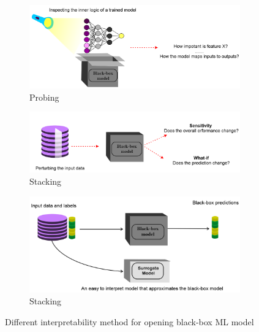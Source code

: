 \begin{figure}
	\centering
	\begin{subfigure}{.48\linewidth}
		\centering
		\includegraphics[scale=0.6]{images/probing.png}
		\caption{Probing}
        \label{fig:probing}
	\end{subfigure}
	\hspace{2mm}
	\begin{subfigure}{0.48\linewidth}
		\centering
		\includegraphics[scale=0.6]{images/purturbing.png}
		\caption{Stacking}
        \label{fig:purturbing}
	\end{subfigure}
		\begin{subfigure}{0.48\linewidth}
		\centering
		\includegraphics[scale=0.6]{images/surrogation.png}
		\caption{Stacking}
        \label{fig:surrogation}
	\end{subfigure}
	\caption{Different interpretability method for opening black-box ML model} 
	\label{fig:pro_per_surroga}
	\vspace{-2mm}
\end{figure}

